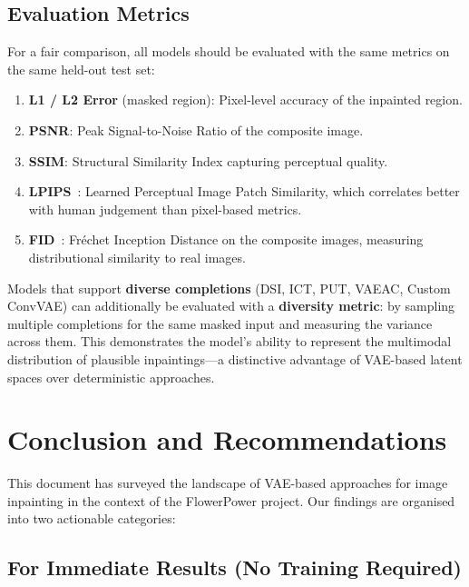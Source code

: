 \documentclass[11pt, a4paper]{article}
\begin{document}
\subsection{Evaluation Metrics}

For a fair comparison, all models should be evaluated with the same metrics on the same held-out test set:

\begin{enumerate}[leftmargin=2em]
  \item \textbf{L1 / L2 Error} (masked region): Pixel-level accuracy of the inpainted region.
  \item \textbf{PSNR}: Peak Signal-to-Noise Ratio of the composite image.
  \item \textbf{SSIM}: Structural Similarity Index capturing perceptual quality.
  \item \textbf{LPIPS}~\cite{zhang2018lpips}: Learned Perceptual Image Patch Similarity, which correlates better with human judgement than pixel-based metrics.
  \item \textbf{FID}~\cite{heusel2017fid}: Fr\'{e}chet Inception Distance on the composite images, measuring distributional similarity to real images.
\end{enumerate}

\begin{notebox}
Models that support \textbf{diverse completions} (DSI, ICT, PUT, VAEAC, Custom ConvVAE) can additionally be evaluated with a \textbf{diversity metric}: by sampling multiple completions for the same masked input and measuring the variance across them. This demonstrates the model's ability to represent the multimodal distribution of plausible inpaintings---a distinctive advantage of VAE-based latent spaces over deterministic approaches.
\end{notebox}


\section{Conclusion and Recommendations}
\label{sec:conclusion}

This document has surveyed the landscape of VAE-based approaches for image inpainting in the context of the FlowerPower project. Our findings are organised into two actionable categories:

\subsection*{For Immediate Results (No Training Required)}
\end{document}
